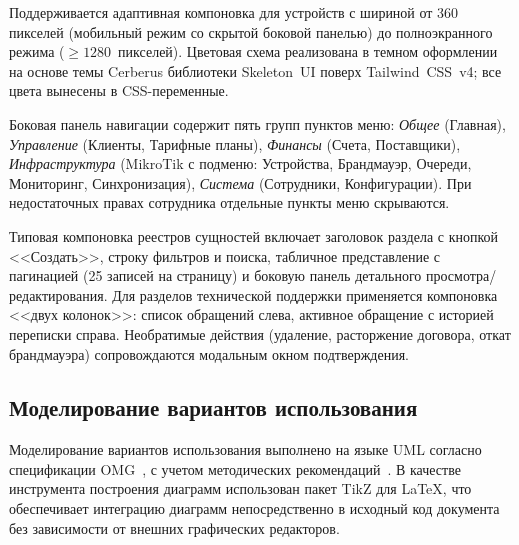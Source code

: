 Поддерживается адаптивная компоновка для устройств с шириной от 360 пикселей (мобильный режим со скрытой боковой панелью) до полноэкранного режима ($\geq 1280$~пикселей). Цветовая схема реализована в темном оформлении на основе темы Cerberus библиотеки Skeleton~UI поверх Tailwind~CSS~v4; все цвета вынесены в CSS-переменные.

Боковая панель навигации содержит пять групп пунктов меню: \emph{Общее} (Главная), \emph{Управление} (Клиенты, Тарифные планы), \emph{Финансы} (Счета, Поставщики), \emph{Инфраструктура} (MikroTik с подменю: Устройства, Брандмауэр, Очереди, Мониторинг, Синхронизация), \emph{Система} (Сотрудники, Конфигурации). При недостаточных правах сотрудника отдельные пункты меню скрываются.

Типовая компоновка реестров сущностей включает заголовок раздела с кнопкой <<Создать>>, строку фильтров и поиска, табличное представление с пагинацией (25 записей на страницу) и боковую панель детального просмотра/редактирования. Для разделов технической поддержки применяется компоновка <<двух колонок>>: список обращений слева, активное обращение с историей переписки справа. Необратимые действия (удаление, расторжение договора, откат брандмауэра) сопровождаются модальным окном подтверждения.

\subsection{Моделирование вариантов использования}

Моделирование вариантов использования выполнено на языке UML согласно спецификации OMG~\cite{omguml}, с учетом методических рекомендаций~\cite{fowler_uml}. В качестве инструмента построения диаграмм использован пакет TikZ для LaTeX, что обеспечивает интеграцию диаграмм непосредственно в исходный код документа без зависимости от внешних графических редакторов.

